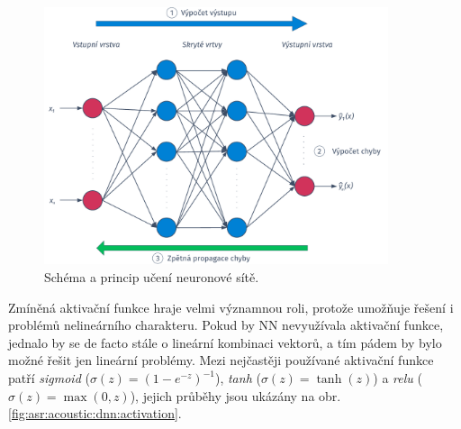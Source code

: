 \begin{figure}[hbpt]
  \centering
  \includegraphics[width=0.9\textwidth]{./ch4-asr/img/dnn-training.pdf}
  \caption{Schéma a princip učení neuronové sítě.}
  \label{fig:asr:acoustic:dnn:training}
\end{figure}

Zmíněná aktivační funkce hraje velmi významnou roli, protože umožňuje řešení i problémů nelineárního charakteru. Pokud by NN nevyužívala aktivační funkce, jednalo by se de facto stále o lineární kombinaci vektorů, a tím pádem by bylo možné řešit jen lineární problémy. Mezi nejčastěji používané aktivační funkce patří \textit{sigmoid} ($\sigma\left(z\right) = \left(1 - e^{-z}\right)^{-1}$), \textit{tanh} ($\sigma\left(z\right) = \tanh\left(z\right)$) a \textit{relu} ($\sigma\left(z\right) = \max\left(0, z\right)$), jejich průběhy jsou ukázány na obr. \ref{fig:asr:acoustic:dnn:activation}.

